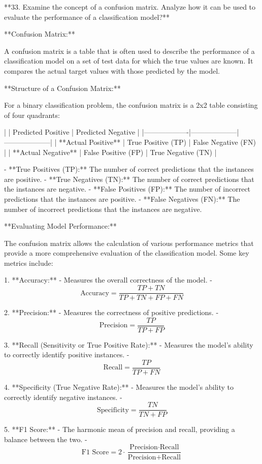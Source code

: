  **33. Examine the concept of a confusion matrix. Analyze how it can be used to evaluate the performance of a classification model?**

**Confusion Matrix:**

A confusion matrix is a table that is often used to describe the performance of a classification model on a set of test data for which the true values are known. It compares the actual target values with those predicted by the model.

**Structure of a Confusion Matrix:**

For a binary classification problem, the confusion matrix is a 2x2 table consisting of four quadrants:

|                   | Predicted Positive | Predicted Negative |
|-------------------|--------------------|--------------------|
| **Actual Positive** | True Positive (TP)  | False Negative (FN) |
| **Actual Negative** | False Positive (FP) | True Negative (TN)  |

- **True Positives (TP):** The number of correct predictions that the instances are positive.
- **True Negatives (TN):** The number of correct predictions that the instances are negative.
- **False Positives (FP):** The number of incorrect predictions that the instances are positive.
- **False Negatives (FN):** The number of incorrect predictions that the instances are negative.

**Evaluating Model Performance:**

The confusion matrix allows the calculation of various performance metrics that provide a more comprehensive evaluation of the classification model. Some key metrics include:

1. **Accuracy:**
   - Measures the overall correctness of the model.
   - \[ \text{Accuracy} = \frac{TP + TN}{TP + TN + FP + FN} \]

2. **Precision:**
   - Measures the correctness of positive predictions.
   - \[ \text{Precision} = \frac{TP}{TP + FP} \]

3. **Recall (Sensitivity or True Positive Rate):**
   - Measures the model's ability to correctly identify positive instances.
   - \[ \text{Recall} = \frac{TP}{TP + FN} \]

4. **Specificity (True Negative Rate):**
   - Measures the model's ability to correctly identify negative instances.
   - \[ \text{Specificity} = \frac{TN}{TN + FP} \]

5. **F1 Score:**
   - The harmonic mean of precision and recall, providing a balance between the two.
   - \[ \text{F1 Score} = 2 \cdot \frac{\text{Precision} \cdot \text{Recall}}{\text{Precision} + \text{Recall}} \]

